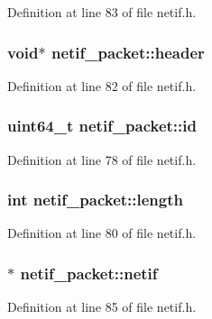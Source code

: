 Definition at line 83 of file netif.\+h.

\hypertarget{structnetif__packet_a3733c55855518d575eea678f5a2815e8}{
\subsubsection[{header}]{\setlength{\rightskip}{0pt plus 5cm}void$\ast$ netif\+\_\+packet\+::header}}\label{structnetif__packet_a3733c55855518d575eea678f5a2815e8}


Definition at line 82 of file netif.\+h.

\hypertarget{structnetif__packet_ac2dc39fe302e155960127c09161f36ae}{
\subsubsection[{id}]{\setlength{\rightskip}{0pt plus 5cm}uint64\+\_\+t netif\+\_\+packet\+::id}}\label{structnetif__packet_ac2dc39fe302e155960127c09161f36ae}


Definition at line 78 of file netif.\+h.

\hypertarget{structnetif__packet_a244620016b7d377fd2558f5ccfc85d18}{
\subsubsection[{length}]{\setlength{\rightskip}{0pt plus 5cm}int netif\+\_\+packet\+::length}}\label{structnetif__packet_a244620016b7d377fd2558f5ccfc85d18}


Definition at line 80 of file netif.\+h.

\hypertarget{structnetif__packet_a3590a941c954bab54971940eeab55144}{
\subsubsection[{netif}]{$\ast$ netif\+\_\+packet\+::netif}}\label{structnetif__packet_a3590a941c954bab54971940eeab55144}


Definition at line 85 of file netif.\+h.

